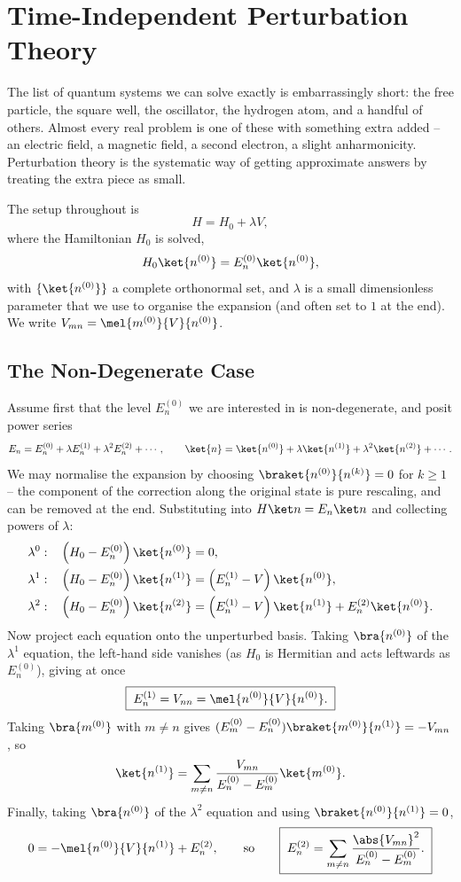 \section{Time-Independent Perturbation Theory}\label{sec:pt}

The list of quantum systems we can solve exactly is embarrassingly short: the free particle, the square well, the oscillator, the hydrogen atom, and a handful of others. Almost every real problem is one of these with something extra added -- an electric field, a magnetic field, a second electron, a slight anharmonicity. Perturbation theory is the systematic way of getting approximate answers by treating the extra piece as small.

The setup throughout is
$$
H = H_0 + \lambda V,
$$
where the  Hamiltonian $H_0$ is solved,
$$
H_0 \ket{n^{(0)}} = E_n^{(0)}\ket{n^{(0)}},
$$
with $\{\ket{n^{(0)}}\}$ a complete orthonormal set, and $\lambda$ is a small dimensionless parameter that we use to organise the expansion (and often set to $1$ at the end). We write $V_{mn} = \mel{m^{(0)}}{V}{n^{(0)}}$.

\subsection{The Non-Degenerate Case}

Assume first that the level $E_n^{(0)}$ we are interested in is non-degenerate, and posit power series
$$
E_n = E_n^{(0)} + \lambda E_n^{(1)} + \lambda^2 E_n^{(2)} + \cdots, \qquad
\ket{n} = \ket{n^{(0)}} + \lambda \ket{n^{(1)}} + \lambda^2\ket{n^{(2)}} + \cdots.
$$
We may normalise the expansion by choosing $\braket{n^{(0)}}{n^{(k)}} = 0$ for $k\geq1$ -- the component of the correction along the original state is pure rescaling, and can be removed at the end. Substituting into $H\ket n = E_n \ket n$ and collecting powers of $\lambda$:
\begin{align*}
    \lambda^0: & \quad \left( H_0 - E_n^{(0)} \right)\ket{n^{(0)}} = 0, \\
    \lambda^1: & \quad \left( H_0 - E_n^{(0)} \right)\ket{n^{(1)}} = \left( E_n^{(1)} - V \right)\ket{n^{(0)}}, \\
    \lambda^2: & \quad \left( H_0 - E_n^{(0)} \right)\ket{n^{(2)}} = \left( E_n^{(1)} - V \right)\ket{n^{(1)}} + E_n^{(2)}\ket{n^{(0)}}.
\end{align*}
Now project each equation onto the unperturbed basis. Taking $\bra{n^{(0)}}$ of the $\lambda^1$ equation, the left-hand side vanishes (as $H_0$ is Hermitian and acts leftwards as $E_n^{(0)}$), giving at once
$$
\boxed{\;E_n^{(1)} = V_{nn} = \mel{n^{(0)}}{V}{n^{(0)}}.\;}
$$
Taking $\bra{m^{(0)}}$ with $m \neq n$ gives $(E_m^{(0)} - E_n^{(0)})\braket{m^{(0)}}{n^{(1)}} = -V_{mn}$, so
$$
\ket{n^{(1)}} = \sum_{m\neq n}\frac{V_{mn}}{E_n^{(0)} - E_m^{(0)}}\ket{m^{(0)}}.
$$
Finally, taking $\bra{n^{(0)}}$ of the $\lambda^2$ equation and using $\braket{n^{(0)}}{n^{(1)}} = 0$,
$$
0 = -\mel{n^{(0)}}{V}{n^{(1)}} + E_n^{(2)}, \qquad \text{so} \qquad
\boxed{\;E_n^{(2)} = \sum_{m\neq n}\frac{\abs{V_{mn}}^2}{E_n^{(0)} - E_m^{(0)}}.\;}
$$

